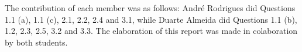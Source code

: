 \cfoot{\thepage}


    \maketitle
    

    \vspace{-4.2em}

    \noindent\makebox[\linewidth]{\rule{18cm}{0.4pt}}

        The contribution of each member was as follows:
         André Rodrigues did Questions 1.1 (a), 1.1 (c), 2.1, 2.2, 2.4 and 3.1, 
         while Duarte Almeida did Questions 1.1 (b), 1.2, 2.3, 2.5, 3.2 and 3.3. The elaboration of this report was made in colaboration by both students.\\
    \vspace{-0.5cm}
    \noindent\makebox[\linewidth]{\rule[1ex]{18cm}{0.4pt}}
    

  
